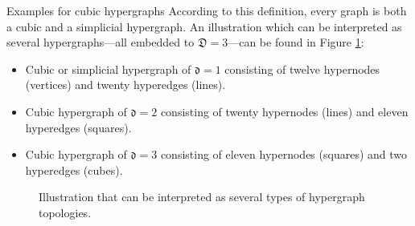 \documentclass[a4paper, english, 12pt, reqno, draft]{amsart}
\makeatletter
\theoremstyle{definition}
\theoremstyle{remark}
\numberwithin{equation}{section}
\newcommand{\locDim}{\ensuremath{\mathfrak d}}
\newcommand{\globDim}{\ensuremath{\mathfrak D}}
\def\paragraph{\@startsection{paragraph}{4}%
  \z@\z@{-\fontdimen2\font}%
  {\normalfont\scshape}}
\makeatother
\begin{document}
\paragraph{Examples for cubic hypergraphs}
% 
According to this definition, every graph is both a cubic and a simplicial hypergraph. An illustration which can be interpreted as several hypergraphs---all embedded to $\globDim = 3$---can be found in Figure \ref{FIG:hyG_topo}:
% 
\begin{itemize}
 \item Cubic or simplicial hypergraph of $\locDim = 1$ consisting of twelve hypernodes (vertices) and  twenty hyperedges (lines).
 \item Cubic hypergraph of $\locDim = 2$ consisting of twenty hypernodes (lines) and eleven hyperedges (squares).
 \item Cubic hypergraph of $\locDim = 3$ consisting of eleven hypernodes (squares) and two hyperedges (cubes).
\end{itemize}
% 
\begin{figure}[ht]
 \caption{Illustration that can be interpreted as several types of hypergraph topologies.}\label{FIG:hyG_topo}
\end{figure}
% 
\end{document}
